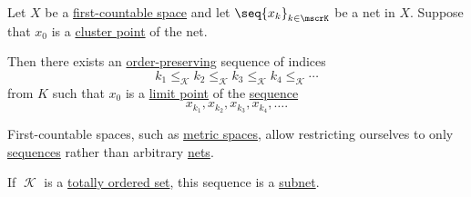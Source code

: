 \begin{proposition}\label{thm:first_countable_space_limit_points}
  Let \( X \) be a \hyperref[def:topological_space_character]{first-countable space} and let \( \seq{ x_k }_{k \in \mscrK} \) be a net in \( X \). Suppose that \( x_0 \) is a \hyperref[def:net_cluster_point]{cluster point} of the net.

  Then there exists an \hyperref[def:order_function/preserving]{order-preserving} sequence of indices
  \begin{equation*}
    k_1 \leq_\mscrK k_2 \leq_\mscrK k_3 \leq_\mscrK k_4 \leq_\mscrK \cdots
  \end{equation*}
  from \( K \) such that \( x_0 \) is a \hyperref[def:net_limit_point]{limit point} of the \hyperref[def:sequence]{sequence}
  \begin{equation*}
    x_{k_1}, x_{k_2}, x_{k_3}, x_{k_4}, \ldots.
  \end{equation*}
\end{proposition}
\begin{comments}
  \item First-countable spaces, such as \hyperref[def:metric_space]{metric spaces}, allow restricting ourselves to only \hyperref[def:sequence]{sequences} rather than arbitrary \hyperref[def:topological_net]{nets}.
  \item If \( \mscrK \) is a \hyperref[def:totally_ordered_set]{totally ordered set}, this sequence is a \hyperref[def:subnet]{subnet}.
\end{comments}
